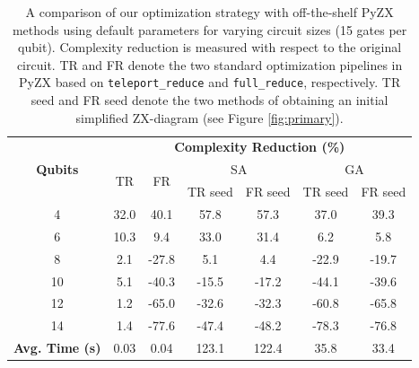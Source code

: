 \begin{table}[t]
  \centering
\begin{tabular}{@{}ccccccc@{}}
\toprule
\multirow{3}{*}{\textbf{Qubits}}           & \multicolumn{6}{c}{\textbf{Complexity Reduction (\%)}}                                                      \\ \cmidrule(l){2-7}
                                           & \multirow{2}{*}{TR} & \multirow{2}{*}{FR} & \multicolumn{2}{c}{SA} & \multicolumn{2}{c}{GA} \\ \cmidrule(l){4-7}
                                           &                     &                     & TR seed    & FR seed   & TR seed    & FR seed   \\ \midrule
4                                          & 32.0                & 40.1                & 57.8       & 57.3      & 37.0       & 39.3      \\
6                                          & 10.3                & 9.4                 & 33.0       & 31.4      & 6.2        & 5.8       \\
8                                          & 2.1                 & -27.8               & 5.1        & 4.4       & -22.9      & -19.7     \\
10                                         & 5.1                 & -40.3               & -15.5      & -17.2     & -44.1      & -39.6     \\
12                                         & 1.2                 & -65.0               & -32.6      & -32.3     & -60.8      & -65.8     \\
14                                         & 1.4                 & -77.6               & -47.4      & -48.2     & -78.3      & -76.8     \\ \midrule
\multicolumn{1}{l}{\textbf{Avg. Time (s)}} & 0.03                & 0.04                & 123.1      & 122.4     & 35.8       & 33.4      \\ \bottomrule
\end{tabular}
\caption{\label{tab:init-results}
  A comparison of our optimization strategy with off-the-shelf PyZX methods using default parameters for varying circuit sizes (15 gates per qubit).
  Complexity reduction is measured with respect to the original circuit.
  TR and FR denote the two standard optimization pipelines in PyZX based on {\color{gray}\texttt{teleport\_reduce}} and {\color{gray}\texttt{full\_reduce}}, respectively.
  TR seed and FR seed denote the two methods of obtaining an initial simplified ZX-diagram (see Figure \ref{fig:primary}).
}
\end{table}



